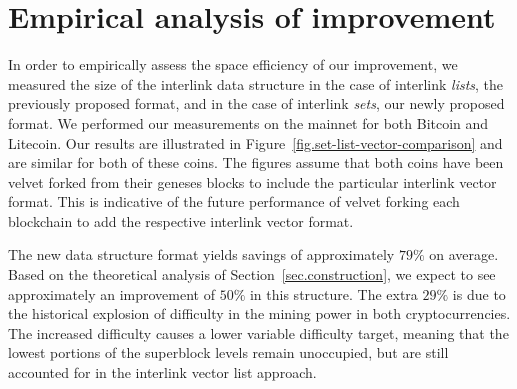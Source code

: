 \section{Empirical analysis of improvement}

In order to empirically assess the space efficiency of our improvement, we
measured the size of the interlink data structure in the case of interlink
\emph{lists}, the previously proposed format, and in the case of interlink
\emph{sets}, our newly proposed format. We performed our measurements on the
mainnet for both Bitcoin and Litecoin. Our results are illustrated in
Figure~\ref{fig.set-list-vector-comparison} and are similar for both of these
coins. The figures assume that both coins have been velvet forked from their
geneses blocks to include the particular interlink vector format. This is
indicative of the future performance of velvet forking each blockchain to add
the respective interlink vector format.

The new data structure format yields savings of approximately $79\%$ on average.
Based on the theoretical analysis of Section~\ref{sec.construction}, we expect
to see approximately an improvement of $50\%$ in this structure. The extra
$29\%$ is due to the historical explosion of difficulty in the mining power in
both cryptocurrencies. The increased difficulty causes a lower variable
difficulty target, meaning that the lowest portions of the superblock levels
remain unoccupied, but are still accounted for in the interlink vector list
approach.

